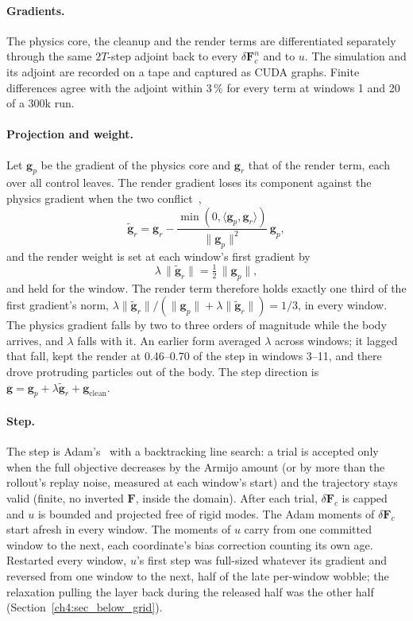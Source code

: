 \paragraph{Gradients.} The physics core, the cleanup and the render terms are differentiated separately through the
same $2T$-step adjoint back to every $\delta\mathbf{F}^n_{c}$ and to $u$. The simulation and its adjoint are recorded on
a tape and captured as CUDA graphs. Finite differences agree with the adjoint within 3\,\% for every term at windows 1
and 20 of a 300k run.

\paragraph{Projection and weight.} Let $\mathbf{g}_p$ be the gradient of the physics core and $\mathbf{g}_r$ that of the
render term, each over all control leaves. The render gradient loses its component against the physics gradient
when the two conflict~\citep{yu2020pcgrad},
\begin{equation}
\tilde{\mathbf{g}}_r=\mathbf{g}_r-\frac{\min(0,\langle\mathbf{g}_p,\mathbf{g}_r\rangle)}{\lVert\mathbf{g}_p\rVert^{2}}\,\mathbf{g}_p ,
\end{equation}
and the render weight is set at each window's first gradient by
\begin{equation}
\label{ch4:eq_lambda}
\lambda\,\lVert\tilde{\mathbf{g}}_r\rVert=\tfrac12\,\lVert\mathbf{g}_p\rVert ,
\end{equation}
and held for the window. The render term therefore holds exactly one third of the first gradient's norm,
$\lambda\lVert\tilde{\mathbf{g}}_r\rVert/(\lVert\mathbf{g}_p\rVert+\lambda\lVert\tilde{\mathbf{g}}_r\rVert)=1/3$, in every
window. The physics gradient falls by two to three orders of magnitude while the body arrives, and $\lambda$ falls with
it. An earlier form averaged $\lambda$ across windows; it lagged that fall, kept the render at 0.46--0.70 of the step in
windows 3--11, and there drove protruding particles out of the body. The step direction is
$\mathbf{g}=\mathbf{g}_p+\lambda\tilde{\mathbf{g}}_r+\mathbf{g}_{\mathrm{clean}}$.

\paragraph{Step.} The step is Adam's~\citep{kingma2017adammethodstochasticoptimization} with a backtracking line search:
a trial is accepted only when the full objective decreases by the Armijo amount (or by more than the rollout's
replay noise, measured at each window's start) and the trajectory stays valid (finite, no inverted
$\mathbf{F}$, inside the domain). After each trial, $\delta\mathbf{F}_c$ is capped and $u$ is bounded and projected free of
rigid modes. The Adam moments of $\delta\mathbf{F}_c$ start afresh in every window. The moments of $u$ carry from one
committed window to the next, each coordinate's bias correction counting its own age. Restarted every window, $u$'s
first step was full-sized whatever its gradient and reversed from one window to the next, half of the late per-window
wobble; the relaxation pulling the layer back during the released half was the other half
(Section~\ref{ch4:sec_below_grid}).

